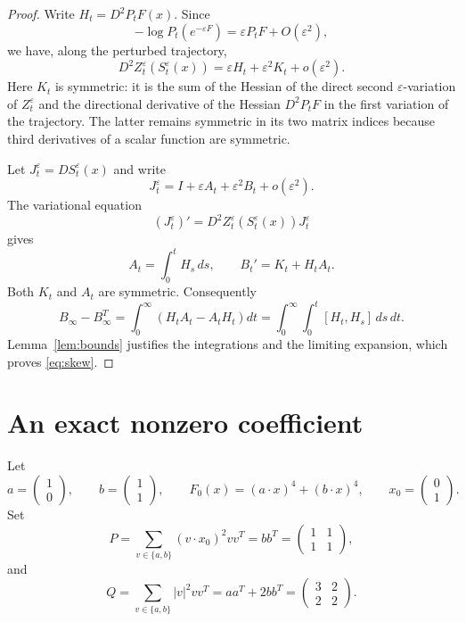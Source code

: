 \documentclass[11pt]{article}
\newcommand{\Hess}{D^2}
\newcommand{\comm}[2]{[#1,#2]}
\begin{document}
\begin{proof}
Write $H_t=\Hess P_tF(x)$. Since
\[
 -\log P_t(e^{-\varepsilon F})
   =\varepsilon P_tF+O(\varepsilon^2),
\]
we have, along the perturbed trajectory,
\[
 \Hess Z_t^\varepsilon(S_t^\varepsilon(x))
   =\varepsilon H_t+\varepsilon^2K_t+o(\varepsilon^2).
\]
Here $K_t$ is symmetric: it is the sum of the Hessian of the direct second
$\varepsilon$-variation of $Z_t^\varepsilon$ and the directional derivative
of the Hessian $\Hess P_tF$ in the first variation of the trajectory.  The
latter remains symmetric in its two matrix indices because third derivatives
of a scalar function are symmetric.

Let $J_t^\varepsilon=DS_t^\varepsilon(x)$ and write
\[
 J_t^\varepsilon=I+\varepsilon A_t+\varepsilon^2B_t+o(\varepsilon^2).
\]
The variational equation
\[
 (J_t^\varepsilon)'=
 \Hess Z_t^\varepsilon(S_t^\varepsilon(x))J_t^\varepsilon
\]
gives
\[
 A_t=\int_0^tH_s\,ds,
 \qquad B_t'=K_t+H_tA_t.
\]
Both $K_t$ and $A_t$ are symmetric. Consequently
\[
 B_\infty-B_\infty^T
 =\int_0^\infty\left(H_tA_t-A_tH_t\right)dt
 =\int_0^\infty\int_0^t\comm{H_t}{H_s}\,ds\,dt.
\]
Lemma~\ref{lem:bounds} justifies the integrations and the limiting expansion,
which proves \eqref{eq:skew}.
\end{proof}

\section{An exact nonzero coefficient}

Let
\[
 a=\begin{pmatrix}1\\0\end{pmatrix},\qquad
 b=\begin{pmatrix}1\\1\end{pmatrix},\qquad
 F_0(x)=(a\cdot x)^4+(b\cdot x)^4,
 \qquad x_0=\begin{pmatrix}0\\1\end{pmatrix}.
\]
Set
\[
 P=\sum_{v\in\{a,b\}}(v\cdot x_0)^2vv^T=bb^T
 =\begin{pmatrix}1&1\\1&1\end{pmatrix},
\]
and
\[
 Q=\sum_{v\in\{a,b\}}\lvert v\rvert^2vv^T=aa^T+2bb^T
 =\begin{pmatrix}3&2\\2&2\end{pmatrix}.
\]
\end{document}
